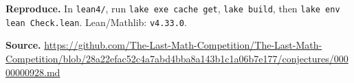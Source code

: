 \documentclass[11pt]{article}
\begin{document}
\textbf{Reproduce.} In \texttt{lean4/}, run \texttt{lake exe cache get},
\texttt{lake build}, then \texttt{lake env lean Check.lean}.
Lean/Mathlib: \texttt{v4.33.0}.

\textbf{Source.} \url{https://github.com/The-Last-Math-Competition/The-Last-Math-Competition/blob/28a22efac52c4a7abd4bba8a143b1c1a06b7e177/conjectures/00000000928.md}
\end{document}
